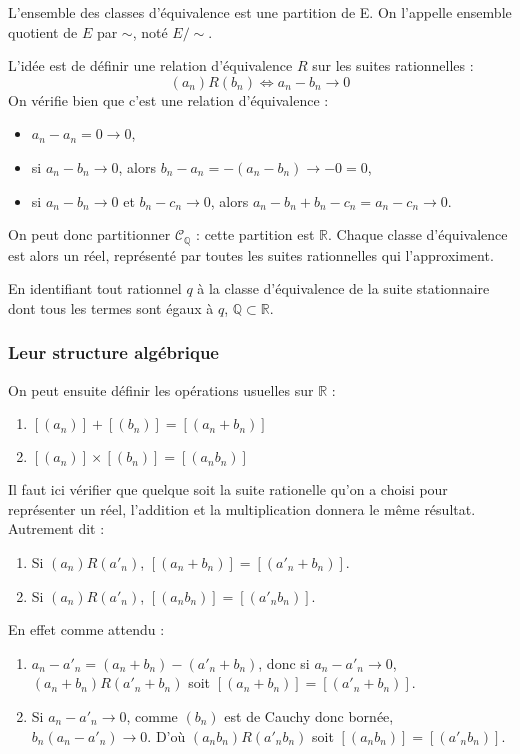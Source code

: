\begin{prop}
    L'ensemble des classes d'équivalence est une partition de E. On l'appelle ensemble quotient de $E$ par $\sim$, noté $E/\sim$.
\end{prop}

L'idée est de définir une relation d'équivalence $R$ sur les suites rationnelles :
$$(a_{n}) R (b_{n}) \iff a_{n}-b_{n} \to 0$$
On vérifie bien que c'est une relation d'équivalence :
\begin{itemize}
    \item $a_n-a_n=0 \to 0$,
    \item si $a_n-b_n \to 0$, alors $b_n-a_n = -(a_n-b_n) \to -0 =0$,
    \item si $a_n-b_n \to 0$ et $b_n-c_n \to 0$, alors $a_n-b_n+b_n-c_n = a_n-c_n \to 0$.
\end{itemize}

On peut donc partitionner $\mathcal{C}_{\mathbb{Q}}$ : cette partition est $\mathbb{R}$. Chaque classe d'équivalence est alors un réel, représenté par toutes les suites rationnelles qui l'approximent.

En identifiant tout rationnel $q$ à la classe d'équivalence de la suite stationnaire dont tous les termes sont égaux à $q$, $\mathbb{Q}\subset \mathbb{R}$.

\subsubsection{Leur structure algébrique}
On peut ensuite définir les opérations usuelles sur $\mathbb{R}$ :
\begin{defini}
    \begin{enumerate}
        \item $[(a_n)]+[(b_n)]=[(a_n+b_n)]$
        \item $[(a_{n})]\times [(b_{n})]=[(a_{n}b_{n})]$
    \end{enumerate}
 
    \tcblower
    Il faut ici vérifier que quelque soit la suite rationelle qu'on a choisi pour représenter un réel, l'addition et la multiplication donnera le même résultat. Autrement dit :
    \begin{enumerate}
        \item Si $(a_n)R(a'_n)$, $[(a_n+b_n)]=[(a'_n+b_n)]$.
        \item Si $(a_n)R(a'_n)$, $[(a_nb_n)]=[(a'_nb_n)]$.
    \end{enumerate}

    En effet comme attendu :
    \begin{enumerate}
    \item $a_n-a'_n = (a_{n}+b_{n})- (a'_{n}+b_{n})$, donc si $a_n-a'_n \to 0$, $(a_n+b_n)R(a'_n+b_n)$ soit $[(a_n+b_n)]=[(a'_n+b_n)]$.
    \item Si $a_n-a'_n \to 0$, comme $(b_n)$ est de Cauchy donc bornée, $b_n(a_n-a'_n) \to 0$.  D'où $(a_nb_n)R(a'_nb_n)$ soit $[(a_nb_n)]=[(a'_nb_n)]$.
    \end{enumerate}
\end{defini}

